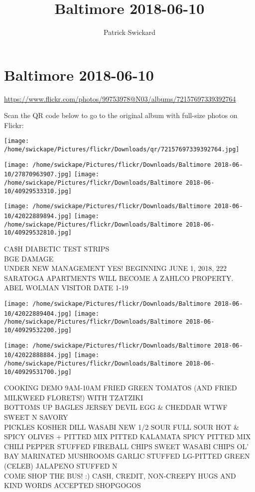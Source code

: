 \documentclass[10pt,letterpaper]{article}
\title{Baltimore 2018-06-10}
\author{Patrick Swickard}
\date{}
\begin{document}
\section*{Baltimore 2018-06-10}

\url{https://www.flickr.com/photos/99753978@N03/albums/72157697339392764}

Scan the QR code below to go to the original album with full-size photos on Flickr:

\texttt{[image: /home/swickape/Pictures/flickr/Downloads/qr/72157697339392764.jpg]}
\pagebreak

\texttt{[image: /home/swickape/Pictures/flickr/Downloads/Baltimore 2018-06-10/27870963907.jpg]}
\texttt{[image: /home/swickape/Pictures/flickr/Downloads/Baltimore 2018-06-10/40929533310.jpg]}

\texttt{[image: /home/swickape/Pictures/flickr/Downloads/Baltimore 2018-06-10/42022889894.jpg]}
\texttt{[image: /home/swickape/Pictures/flickr/Downloads/Baltimore 2018-06-10/40929532810.jpg]}

CA\$H DIABETIC TEST STRIPS\\
BGE DAMAGE\\
UNDER NEW MANAGEMENT YES!  BEGINNING JUNE 1, 2018, 222 SARATOGA APARTMENTS WILL BECOME A ZAHLCO PROPERTY.\\
ABEL WOLMAN VISITOR DATE 1{-}19
\pagebreak

\texttt{[image: /home/swickape/Pictures/flickr/Downloads/Baltimore 2018-06-10/42022889404.jpg]}
\texttt{[image: /home/swickape/Pictures/flickr/Downloads/Baltimore 2018-06-10/40929532200.jpg]}

\texttt{[image: /home/swickape/Pictures/flickr/Downloads/Baltimore 2018-06-10/42022888884.jpg]}
\texttt{[image: /home/swickape/Pictures/flickr/Downloads/Baltimore 2018-06-10/40929531700.jpg]}

COOKING DEMO 9AM{-}10AM FRIED GREEN TOMATOS (AND FRIED MILKWEED FLORETS!) WITH TZATZIKI\\
BOTTOMS UP BAGLES JERSEY DEVIL EGG \& CHEDDAR WTWF SWEET N SAVORY\\
PICKLES KOSHER DILL WASABI NEW 1/2 SOUR FULL SOUR HOT \& SPICY OLIVES + PITTED MIX PITTED KALAMATA SPICY PITTED MIX CHILI PEPPER STUFFED FIREBALL CHIPS SWEET WASABI CHIPS OL' BAY MARINATED MUSHROOMS GARLIC STUFFED LG{-}PITTED GREEN (CELEB) JALAPENO STUFFED N\\
COME SHOP THE BUS!  :) CASH, CREDIT, NON{-}CREEPY HUGS AND KIND WORDS ACCEPTED SHOPGOGOS
\pagebreak
\end{document}
